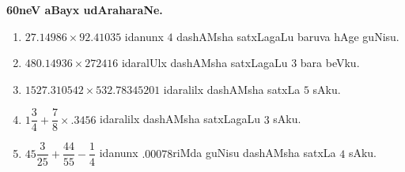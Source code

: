 \bigskip

\begin{center}
{\bf\Large 60neV aBayx udAraharaNe.}
\end{center}

\begin{enumerate}[\rm(1)]
\item $27.14986\times92.41035$ idanunx $4$ dashAMsha satxLagaLu baruva hAge guNisu.

\item $480.14936\times272416$ idaralUlx dashAMsha satxLagaLu $3$ bara beVku.

\item $1527.310542\times532.78345201$ idaralilx dashAMsha satxLa $5$ sAku.

\item $1\dfrac{3}{4}+\dfrac{7}{8}\times.3456$ idaralilx dashAMsha satxLagaLu $3$ sAku.

\item $45\dfrac{3}{25}+\dfrac{44}{55}-\dfrac{1}{4}$ idanunx $.00078$riMda guNisu dashAMsha satxLa $4$ sAku.
\end{enumerate}



